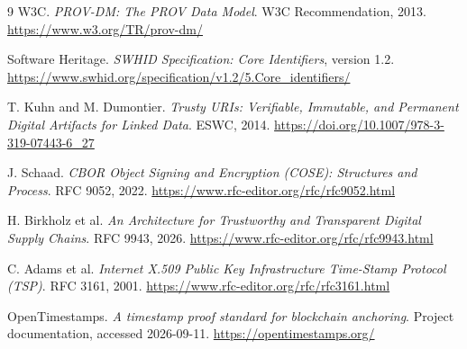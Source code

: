 \documentclass[11pt]{article}
\begin{document}
\begin{thebibliography}{9}
W3C. \emph{PROV-DM: The PROV Data Model}. W3C Recommendation, 2013. \url{https://www.w3.org/TR/prov-dm/}

Software Heritage. \emph{SWHID Specification: Core Identifiers}, version 1.2. \url{https://www.swhid.org/specification/v1.2/5.Core_identifiers/}

T. Kuhn and M. Dumontier. \emph{Trusty URIs: Verifiable, Immutable, and Permanent Digital Artifacts for Linked Data}. ESWC, 2014. \url{https://doi.org/10.1007/978-3-319-07443-6_27}

J. Schaad. \emph{CBOR Object Signing and Encryption (COSE): Structures and Process}. RFC 9052, 2022. \url{https://www.rfc-editor.org/rfc/rfc9052.html}

H. Birkholz et al. \emph{An Architecture for Trustworthy and Transparent Digital Supply Chains}. RFC 9943, 2026. \url{https://www.rfc-editor.org/rfc/rfc9943.html}

C. Adams et al. \emph{Internet X.509 Public Key Infrastructure Time-Stamp Protocol (TSP)}. RFC 3161, 2001. \url{https://www.rfc-editor.org/rfc/rfc3161.html}

OpenTimestamps. \emph{A timestamp proof standard for blockchain anchoring}.
Project documentation, accessed 2026-09-11. \url{https://opentimestamps.org/}
\end{thebibliography}
\end{document}
